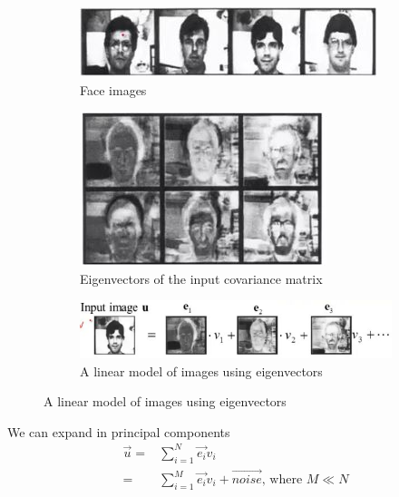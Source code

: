 \documentclass[]{article}
\begin{document}
\begin{figure}[H]
	\begin{center}
		\caption[Eigenfaces]{Eigenfaces\cite{turk1991eigenfaces}}
		\begin{subfigure}[t]{0.9\textwidth}
			\caption{Face images}
			\includegraphics[width=\textwidth]{eigenfaces1}
		\end{subfigure}
		\begin{subfigure}[t]{0.9\textwidth}
			\caption{Eigenvectors of the input covariance matrix}
			\includegraphics[width=\textwidth]{eigenfaces2}
		\end{subfigure}
		\begin{subfigure}[t]{0.9\textwidth}
			\caption{A linear model of images using eigenvectors}
			\includegraphics[width=\textwidth]{eigenfaces3}
		\end{subfigure}
	\end{center}
\end{figure}

We can expand in principal components
\begin{align*}
	\vec{u} =& \sum_{i=1}^{N} \vec{e_i} v_i \\
	=& \sum_{i=1}^{M} \vec{e_i} v_i + \vec{noise} \text{, where $M\ll N$}
\end{align*}
\end{document}
